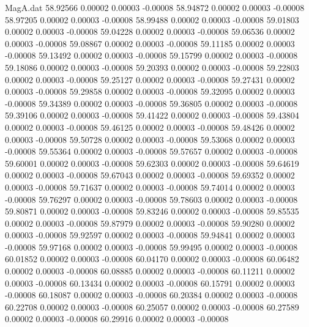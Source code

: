 \begin{filecontents}{MagA.dat}
  58.92566    0.00002    0.00003   -0.00008
  58.94872    0.00002    0.00003   -0.00008
  58.97205    0.00002    0.00003   -0.00008
  58.99488    0.00002    0.00003   -0.00008
  59.01803    0.00002    0.00003   -0.00008
  59.04228    0.00002    0.00003   -0.00008
  59.06536    0.00002    0.00003   -0.00008
  59.08867    0.00002    0.00003   -0.00008
  59.11185    0.00002    0.00003   -0.00008
  59.13492    0.00002    0.00003   -0.00008
  59.15799    0.00002    0.00003   -0.00008
  59.18086    0.00002    0.00003   -0.00008
  59.20393    0.00002    0.00003   -0.00008
  59.22803    0.00002    0.00003   -0.00008
  59.25127    0.00002    0.00003   -0.00008
  59.27431    0.00002    0.00003   -0.00008
  59.29858    0.00002    0.00003   -0.00008
  59.32095    0.00002    0.00003   -0.00008
  59.34389    0.00002    0.00003   -0.00008
  59.36805    0.00002    0.00003   -0.00008
  59.39106    0.00002    0.00003   -0.00008
  59.41422    0.00002    0.00003   -0.00008
  59.43804    0.00002    0.00003   -0.00008
  59.46125    0.00002    0.00003   -0.00008
  59.48426    0.00002    0.00003   -0.00008
  59.50728    0.00002    0.00003   -0.00008
  59.53068    0.00002    0.00003   -0.00008
  59.55364    0.00002    0.00003   -0.00008
  59.57657    0.00002    0.00003   -0.00008
  59.60001    0.00002    0.00003   -0.00008
  59.62303    0.00002    0.00003   -0.00008
  59.64619    0.00002    0.00003   -0.00008
  59.67043    0.00002    0.00003   -0.00008
  59.69352    0.00002    0.00003   -0.00008
  59.71637    0.00002    0.00003   -0.00008
  59.74014    0.00002    0.00003   -0.00008
  59.76297    0.00002    0.00003   -0.00008
  59.78603    0.00002    0.00003   -0.00008
  59.80871    0.00002    0.00003   -0.00008
  59.83246    0.00002    0.00003   -0.00008
  59.85535    0.00002    0.00003   -0.00008
  59.87979    0.00002    0.00003   -0.00008
  59.90280    0.00002    0.00003   -0.00008
  59.92597    0.00002    0.00003   -0.00008
  59.94841    0.00002    0.00003   -0.00008
  59.97168    0.00002    0.00003   -0.00008
  59.99495    0.00002    0.00003   -0.00008
  60.01852    0.00002    0.00003   -0.00008
  60.04170    0.00002    0.00003   -0.00008
  60.06482    0.00002    0.00003   -0.00008
  60.08885    0.00002    0.00003   -0.00008
  60.11211    0.00002    0.00003   -0.00008
  60.13434    0.00002    0.00003   -0.00008
  60.15791    0.00002    0.00003   -0.00008
  60.18087    0.00002    0.00003   -0.00008
  60.20384    0.00002    0.00003   -0.00008
  60.22708    0.00002    0.00003   -0.00008
  60.25057    0.00002    0.00003   -0.00008
  60.27589    0.00002    0.00003   -0.00008
  60.29916    0.00002    0.00003   -0.00008

\end{filecontents}
